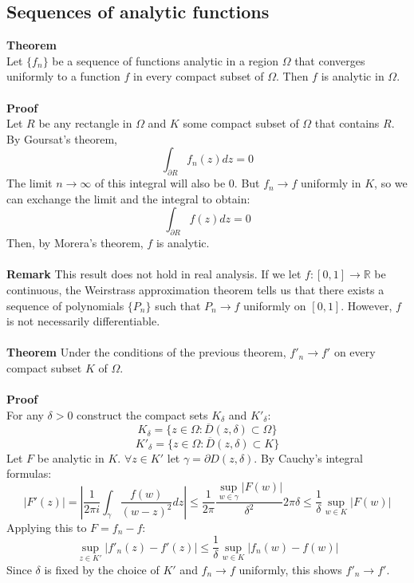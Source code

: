 \documentclass[12 pt]{article}
\begin{document}
\subsection{Sequences of analytic functions}
\textbf{Theorem}
\\
Let $\{f_n\}$ be a sequence of functions analytic in a region $\Omega$ that converges uniformly to a function $f$ in every compact subset of $\Omega$. Then $f$ is analytic in $\Omega$.
\\
\\
\textbf{Proof}
\\
Let $R$ be any rectangle in $\Omega$ and $K$ some compact subset of $\Omega$ that contains $R$. By Goursat's theorem,
\[ \int_{\partial R} f_{n}(z) dz = 0 \]
The limit $n\to \infty$ of this integral will also be 0. But $f_{n}\to f$ uniformly in $K$, so we can exchange the limit and the integral to obtain:
\[ \int_{\partial R} f(z) dz = 0 \]
Then, by Morera's theorem, $f$ is analytic.
\\
\\
\textbf{Remark}
This result does not hold in real analysis. If we let $f:[0,1]\to \mathbb{R}$ be continuous, the Weirstrass approximation theorem tells us that there exists a sequence of polynomials $\{ P_{n} \} $ such that $P_{n}\to f$ uniformly on $[0,1]$. However, $f$ is not necessarily differentiable.
\\
\\
\textbf{Theorem}
Under the conditions of the previous theorem, $f'_{n}\to f'$ on every compact subset $K$ of $\Omega$.
\\
\\
\textbf{Proof}
\\
For any $\delta >0$ construct the compact sets $K_{\delta}$ and $K'_{\delta}$:
\[ K_{\delta} = \{z\in \Omega : \overline{ D}(z,\delta) \subset \Omega \}\]
\[ K'_{\delta} = \{z\in \Omega : \overline{ D}(z,\delta) \subset K \}\]
Let $F$ be analytic in $K$. $\forall z\in K'$ let $\gamma = \partial D(z,\delta)$. By Cauchy's integral formulas:
\[ |F'(z)| = \left| \frac{1}{2\pi i} \int_{\gamma} \frac{f(w)}{(w-z)^2} dz  \right| \leq \frac{1}{2\pi} \frac{\sup_{w\in \gamma}|F(w)|}{\delta^2} 2\pi \delta \leq \frac{1}{\delta} \sup_{w\in K} |F(w)| \]
Applying this to $F = f_{n}-f$:
\[ \sup_{z\in K'}|f'_{n}(z) - f'(z)| \leq \frac{1}{\delta} \sup_{w\in K} |f_{n}(w)-f(w)| \]
Since $\delta$ is fixed by the choice of $K'$ and $f_{n}\to f$ uniformly, this shows $f'_{n}\to f'$.
\end{document}
